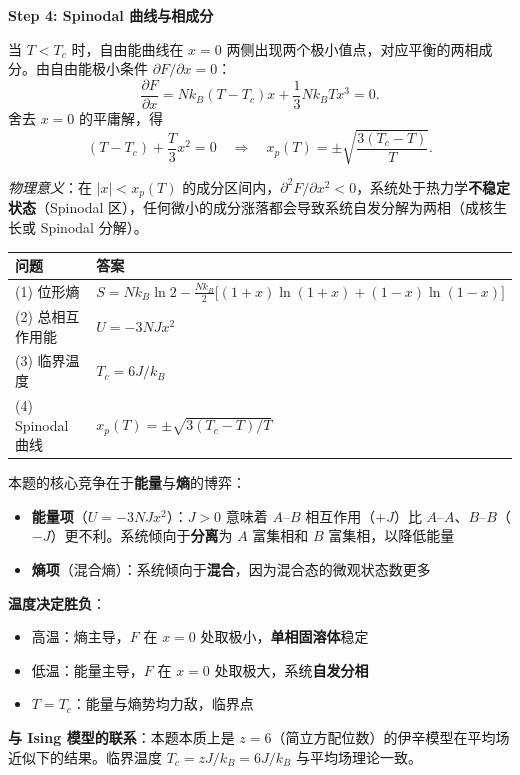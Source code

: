 \begin{derivationbox}[标准解题过程]
\textbf{Step 4: Spinodal 曲线与相成分}

当 $T<T_c$ 时，自由能曲线在 $x=0$ 两侧出现两个极小值点，对应平衡的两相成分。由自由能极小条件 $\partial F/\partial x=0$：
\begin{equation}
\frac{\partial F}{\partial x} = Nk_{\!B}(T-T_c)x + \frac{1}{3}Nk_{\!B}Tx^3 = 0.
\end{equation}
舍去 $x=0$ 的平庸解，得
\begin{equation}
(T-T_c) + \frac{T}{3}x^2 = 0
\quad\Longrightarrow\quad
\boxed{x_p(T) = \pm\sqrt{\frac{3(T_c-T)}{T}}.}
\end{equation}

\textit{物理意义}：在 $|x|<x_p(T)$ 的成分区间内，$\partial^2 F/\partial x^2<0$，系统处于热力学\textbf{不稳定状态}（Spinodal 区），任何微小的成分涨落都会导致系统自发分解为两相（成核生长或 Spinodal 分解）。
\end{derivationbox}

\begin{formulabox}[答案汇总]
\begin{center}
\begin{tabular}{ll}
\toprule
\textbf{问题} & \textbf{答案} \\
\midrule
(1) 位形熵 & $\displaystyle S = Nk_{\!B}\ln 2 - \frac{Nk_{\!B}}{2}\bigl[(1+x)\ln(1+x)+(1-x)\ln(1-x)\bigr]$ \\
(2) 总相互作用能 & $U = -3NJx^2$ \\
(3) 临界温度 & $T_c = 6J/k_{\!B}$ \\
(4) Spinodal 曲线 & $\displaystyle x_p(T) = \pm\sqrt{3(T_c-T)/T}$ \\
\bottomrule
\end{tabular}
\end{center}
\end{formulabox}

\begin{insightbox}
本题的核心竞争在于\textbf{能量}与\textbf{熵}的博弈：
\begin{itemize}
    \item \textbf{能量项}（$U=-3NJx^2$）：$J>0$ 意味着 $A$--$B$ 相互作用（$+J$）比 $A$--$A$、$B$--$B$（$-J$）更不利。系统倾向于\textbf{分离}为 $A$ 富集相和 $B$ 富集相，以降低能量
    \item \textbf{熵项}（混合熵）：系统倾向于\textbf{混合}，因为混合态的微观状态数更多
\end{itemize}

\textbf{温度决定胜负}：
\begin{itemize}
    \item 高温：熵主导，$F$ 在 $x=0$ 处取极小，\textbf{单相固溶体}稳定
    \item 低温：能量主导，$F$ 在 $x=0$ 处取极大，系统\textbf{自发分相}
    \item $T=T_c$：能量与熵势均力敌，临界点
\end{itemize}

\textbf{与 Ising 模型的联系}：本题本质上是 $z=6$（简立方配位数）的伊辛模型在平均场近似下的结果。临界温度 $T_c=zJ/k_{\!B}=6J/k_{\!B}$ 与平均场理论一致。
\end{insightbox}

